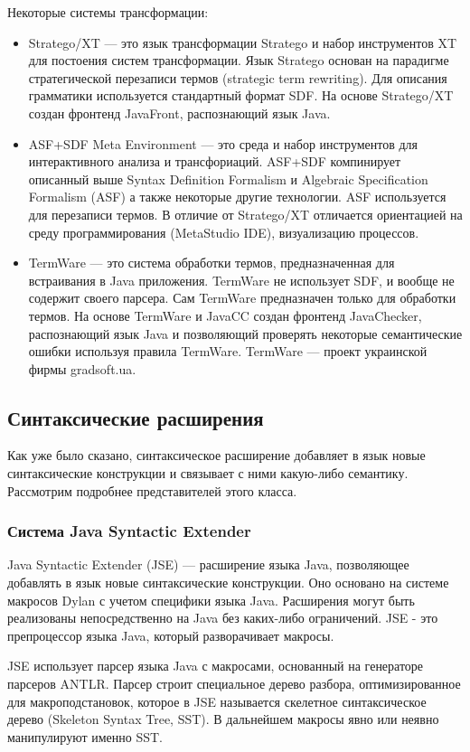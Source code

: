 \documentclass[a4paper,12pt]{article}
\begin{document}
Некоторые системы трансформации:
\begin{itemize}
  \item Stratego/XT --- это язык трансформации Stratego и набор инструментов 
  XT для постоения систем трансформации. Язык Stratego основан на парадигме
  стратегической перезаписи термов (strategic term rewriting). Для описания
  грамматики используется стандартный формат SDF. На основе Stratego/XT создан
  фронтенд JavaFront, распознающий язык Java.
  \item ASF+SDF Meta Environment --- это среда и набор инструментов для
  интерактивного анализа и трансфориаций. ASF+SDF компинирует описанный
  выше Syntax Definition Formalism и Algebraic Specification Formalism (ASF) а
  также некоторые другие технологии. ASF используется для перезаписи термов.
  В отличие от Stratego/XT отличается ориентацией на среду программирования
  (MetaStudio IDE), визуализацию процессов.
  \item TermWare --- это система обработки термов, предназначенная для
  встраивания в Java приложения. TermWare не использует SDF, и вообще не
  содержит своего парсера. Сам TermWare предназначен только для обработки
  термов. На основе TermWare и JavaCC создан фронтенд JavaChecker, распознающий
  язык Java и позволяющий проверять некоторые семантические ошибки используя
  правила TermWare. TermWare --- проект украинской фирмы gradsoft.ua.
\end{itemize}

\subsection{Синтаксические расширения}
Как уже было сказано, синтаксическое расширение добавляет в язык новые
синтаксические конструкции и связывает с ними какую-либо семантику.
Рассмотрим подробнее представителей этого класса.

\subsubsection*{Система Java Syntactic Extender}
\label{jse}
Java Syntactic Extender (JSE) --- расширение языка Java, позволяющее добавлять в
язык новые синтаксические конструкции. Оно основано на системе макросов Dylan с
учетом специфики языка Java. Расширения могут быть реализованы
непосредственно на Java без каких-либо ограничений. JSE - это
препроцессор языка Java, который разворачивает макросы.

JSE использует парсер языка Java с макросами, основанный на генераторе парсеров
ANTLR. Парсер строит специальное дерево разбора, оптимизированное для
макроподстановок, которое в JSE называется скелетное синтаксическое дерево
(Skeleton Syntax Tree, SST). В дальнейшем макросы явно или неявно манипулируют
именно SST.
\end{document}
